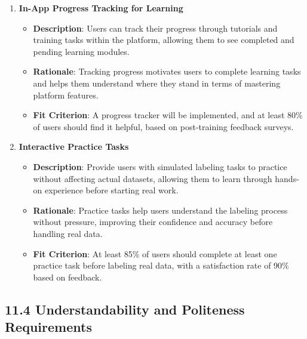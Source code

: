 \documentclass[12pt]{article}
\begin{document}
\begin{enumerate}
    \item \textbf{In-App Progress Tracking for Learning}  
        \begin{itemize} 
            \item \textbf{Description}: Users can track their progress through tutorials and training tasks within the platform, allowing them to see completed and pending learning modules.  
            \item \textbf{Rationale}: Tracking progress motivates users to complete learning tasks and helps them understand where they stand in terms of mastering platform features.  
            \item \textbf{Fit Criterion}: A progress tracker will be implemented, and at least 80\% of users should find it helpful, based on post-training feedback surveys.
        \end{itemize}
    \item \textbf{Interactive Practice Tasks}  
        \begin{itemize} 
            \item \textbf{Description}: Provide users with simulated labeling tasks to practice without affecting actual datasets, allowing them to learn through hands-on experience before starting real work.  
            \item \textbf{Rationale}: Practice tasks help users understand the labeling process without pressure, improving their confidence and accuracy before handling real data.  
            \item \textbf{Fit Criterion}: At least 85\% of users should complete at least one practice task before labeling real data, with a satisfaction rate of 90\% based on feedback.
        \end{itemize}
\end{enumerate}

\subsection*{11.4 Understandability and Politeness Requirements}
\end{document}
